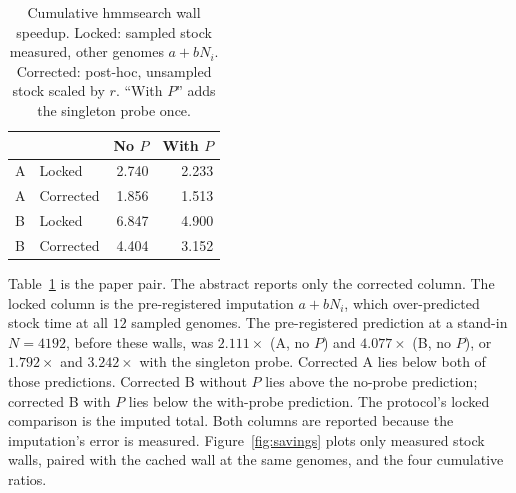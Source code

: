 \documentclass[letterpaper,twocolumn,10pt]{article}
\begin{document}
\begin{table}[t]
\caption{Cumulative hmmsearch wall speedup.
Locked: sampled stock measured, other genomes $a+b N_i$.
Corrected: post-hoc, unsampled stock scaled by $r$.
``With $P$'' adds the singleton probe once.}
\label{tab:savings}
\small
\begin{tabular}{@{}llrr@{}}
\toprule
& & No $P$ & With $P$ \\
\midrule
A & Locked & 2.740 & 2.233 \\
A & Corrected & 1.856 & 1.513 \\
B & Locked & 6.847 & 4.900 \\
B & Corrected & 4.404 & 3.152 \\
\bottomrule
\end{tabular}
\end{table}

Table~\ref{tab:savings} is the paper pair.
The abstract reports only the corrected column.
The locked column is the pre-registered imputation $a + b N_i$, which over-predicted stock time at all $12$ sampled genomes.
The pre-registered prediction at a stand-in $N = 4192$, before these walls, was
$2.111\times$
(A, no $P$) and
$4.077\times$
(B, no $P$), or
$1.792\times$
and
$3.242\times$
with the singleton probe.
Corrected A lies below both of those predictions.
Corrected B without $P$ lies above the no-probe prediction; corrected B with $P$ lies below the with-probe prediction.
The protocol's locked comparison is the imputed total.
Both columns are reported because the imputation's error is measured.
Figure~\ref{fig:savings} plots only measured stock walls, paired with the cached wall at the same genomes, and the four cumulative ratios.
\end{document}
